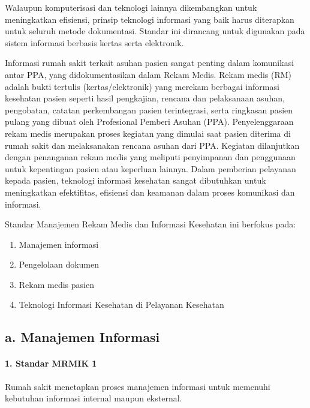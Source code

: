 \documentclass[
]{book}
\providecommand{\tightlist}{%
  \setlength{\itemsep}{0pt}\setlength{\parskip}{0pt}}
\begin{document}
Walaupun komputerisasi dan teknologi lainnya dikembangkan untuk meningkatkan efisiensi, prinsip teknologi informasi yang baik harus diterapkan untuk seluruh metode dokumentasi. Standar ini dirancang untuk digunakan pada sistem informasi berbasis kertas serta elektronik.

Informasi rumah sakit terkait asuhan pasien sangat penting dalam komunikasi antar PPA, yang didokumentasikan dalam Rekam Medis. Rekam medis (RM) adalah bukti tertulis (kertas/elektronik) yang merekam berbagai informasi kesehatan pasien seperti hasil pengkajian, rencana dan pelaksanaan asuhan, pengobatan, catatan perkembangan pasien terintegrasi, serta ringkasan pasien pulang yang dibuat oleh Profesional Pemberi Asuhan (PPA). Penyelenggaraan rekam medis merupakan proses kegiatan yang dimulai saat pasien diterima di rumah sakit dan melaksanakan rencana asuhan dari PPA. Kegiatan dilanjutkan dengan penanganan rekam medis yang meliputi penyimpanan dan penggunaan untuk kepentingan pasien atau keperluan lainnya.
Dalam pemberian pelayanan kepada pasien, teknologi informasi kesehatan sangat dibutuhkan untuk meningkatkan efektifitas, efisiensi dan keamanan dalam proses komunikasi dan informasi.

Standar Manajemen Rekam Medis dan Informasi Kesehatan ini berfokus pada:

\begin{enumerate}
\def\labelenumi{\alph{enumi}.}
\tightlist
\item
  Manajemen informasi
\item
  Pengelolaan dokumen
\item
  Rekam medis pasien
\item
  Teknologi Informasi Kesehatan di Pelayanan Kesehatan
\end{enumerate}

\hypertarget{a.-manajemen-informasi}{%
\subsection*{a. Manajemen Informasi}\label{a.-manajemen-informasi}}

\hypertarget{standar-mrmik-1}{%
\paragraph*{1. Standar MRMIK 1}\label{standar-mrmik-1}}

Rumah sakit menetapkan proses manajemen informasi untuk memenuhi kebutuhan informasi internal maupun eksternal.
\end{document}
